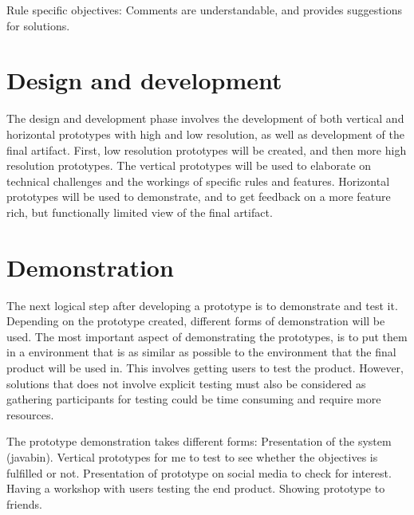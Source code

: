\documentclass{report}
\begin{document}


Rule specific objectives: 
Comments are understandable, and provides suggestions for solutions.

\section{Design and development}

The design and development phase involves the development of both vertical and horizontal prototypes with high and low resolution, as well as development of the final artifact. First, low resolution prototypes will be created, and then more high resolution prototypes. The vertical prototypes will be used to elaborate on technical challenges and the workings of specific rules and features. Horizontal prototypes will be used to demonstrate, and to get feedback on a more feature rich, but functionally limited view of the final artifact. 

 
\section{Demonstration}

The next logical step after developing a prototype is to demonstrate and test it. Depending on the prototype created, different forms of demonstration will be used. The most important aspect of demonstrating the prototypes, is to put them in a environment that is as similar as possible to the environment that the final product will be used in. This involves getting users to test the product. However, solutions that does not involve explicit testing must also be considered as gathering participants for testing could be time consuming and require more resources.  

The prototype demonstration takes different forms:
Presentation of the system (javabin). 
Vertical prototypes for me to test to see whether the objectives is fulfilled or not.
Presentation of prototype on social media to check for interest.
Having a workshop with users testing the end product.
Showing prototype to friends.
\end{document}
